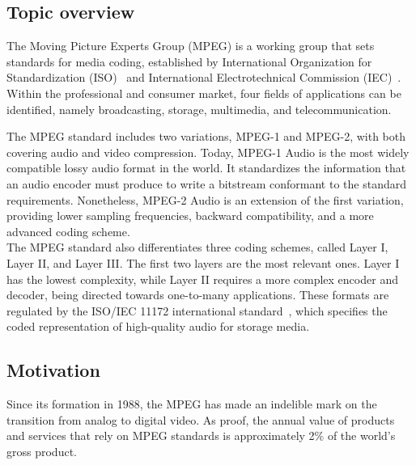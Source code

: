 
\subsection{Topic overview}
The Moving Picture Experts Group (MPEG) is a working group that sets standards
for media coding, established by International Organization for Standardization
(ISO)~\cite{iso} and International Electrotechnical Commission (IEC)~\cite{iec}.
Within the professional and consumer market, four fields of applications can be
identified, namely broadcasting, storage, multimedia, and telecommunication.

The MPEG standard includes two variations, MPEG-1 and MPEG-2, with both covering
audio and video compression.  Today, MPEG-1 Audio is the most widely compatible
lossy audio format in the world. It standardizes the information that an audio
encoder must produce to write a bitstream conformant to the standard
requirements.  Nonetheless, MPEG-2 Audio is an extension of the first variation,
providing lower sampling frequencies, backward compatibility, and a more
advanced coding scheme.\\

The MPEG standard also differentiates three coding schemes, called Layer I,
Layer II, and Layer III.  The first two layers are the most relevant ones. Layer
I has the lowest complexity, while Layer II requires a more complex encoder and
decoder, being directed towards one-to-many applications. These formats are
regulated by the ISO/IEC 11172 international standard~\cite{xxxx}, which
specifies the coded representation of high-quality audio for storage media.

\subsection{Motivation}

Since its formation in 1988, the MPEG has made an indelible mark on the
transition from analog to digital video. As proof, the annual value of products
and services that rely on MPEG standards is approximately 2\% of the world's
gross product.

